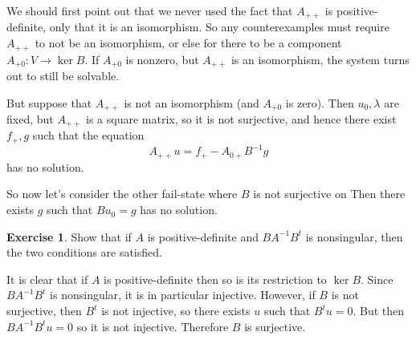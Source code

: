 \documentclass[10pt]{article}
\theoremstyle{definition}
\newtheorem{exer}{Exercise}
\begin{document}
We should first point out that we never used the fact that $A_{++}$ is positive-definite, only that it is an isomorphism.
So any counterexamples must require $A_{++}$ to not be an isomorphism, or else for there to be a component $A_{+0}: V \to \ker B$.
If $A_{+0}$ is nonzero, but $A_{++}$ is an isomorphism, the system turns out to still be solvable.

But suppose that $A_{++}$ is not an isomorphism (and $A_{+0}$ is zero). Then $u_0, \lambda$ are fixed, but $A_{++}$ is a square matrix, so it is not surjective, and hence there exist $f_+, g$ such that the equation
$$A_{++} u = f_+ - A_{0+} B^{-1} g$$
has no solution.

So now let's consider the other fail-state where $B$ is not surjective on
Then there exists $g$ such that $Bu_0 = g$ has no solution.

\begin{exer}
Show that if $A$ is positive-definite and $BA^{-1}B^t$ is nonsingular, then the two conditions are satisfied.
\end{exer}

It is clear that if $A$ is positive-definite then so is its restriction to $\ker B$.
Since $BA^{-1}B^t$ is nonsingular, it is in particular injective.
However, if $B$ is not surjective, then $B^t$ is not injective, so there exists $u$ such that $B^t u = 0$.
But then $BA^{-1}B^t u = 0$ so it is not injective.
Therefore $B$ is surjective.
\end{document}
